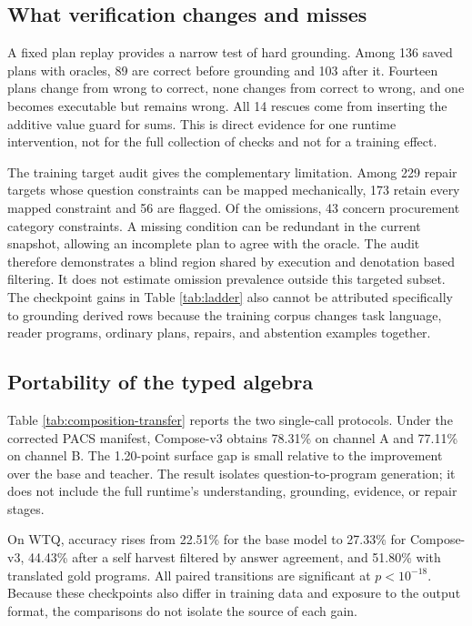 \subsection{What verification changes and misses}

A fixed plan replay provides a narrow test of hard grounding.  Among 136 saved plans with oracles,
89 are correct before grounding and 103 after it.  Fourteen plans change from wrong to correct,
none changes from correct to wrong, and one becomes executable but remains wrong.  All 14 rescues
come from inserting the additive value guard for sums.  This is direct evidence for one runtime
intervention, not for the full collection of checks and not for a training effect.

The training target audit gives the complementary limitation.  Among 229 repair targets whose
question constraints can be mapped mechanically, 173 retain every mapped constraint and 56 are
flagged.  Of the omissions, 43 concern procurement category constraints.  A missing condition can be
redundant in the current snapshot, allowing an incomplete plan to agree with the oracle.  The audit
therefore demonstrates a blind region shared by execution and denotation based filtering.  It does
not estimate omission prevalence outside this targeted subset.  The checkpoint gains in Table
\ref{tab:ladder} also cannot be attributed specifically to grounding derived rows because the
training corpus changes task language, reader programs, ordinary plans, repairs, and abstention
examples together.

\subsection{Portability of the typed algebra}

Table \ref{tab:composition-transfer} reports the two single-call protocols.  Under the corrected
PACS manifest, Compose-v3 obtains 78.31\% on channel A and 77.11\% on channel B.  The 1.20-point
surface gap is small relative to the improvement over the base and teacher.  The result isolates
question-to-program generation; it does not include the full runtime's understanding, grounding,
evidence, or repair stages.

On WTQ, accuracy rises from 22.51\% for the base model to 27.33\% for Compose-v3, 44.43\% after
a self harvest filtered by answer agreement, and 51.80\% with translated gold programs.  All paired transitions are
significant at $p<10^{-18}$.  Because these checkpoints also differ in training data and exposure
to the output format, the comparisons do not isolate the source of each gain.

